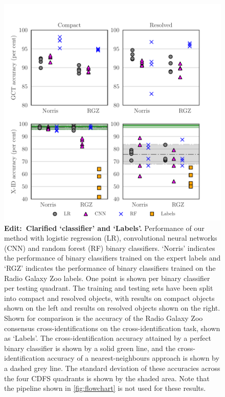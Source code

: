 \documentclass[fleqn,usenatbib,usedcolumn]{mnras}
\newcommand{\edit}[1]{{\bf Edit:~{#1}}}
\begin{document}
    \begin{figure}
    \centering
    \includegraphics[width=\columnwidth]{images/cdfs-grid-new.pdf}
    \caption{\edit{Clarified `classifier' and `Labels'.} Performance of our method with logistic regression (LR), convolutional neural networks (CNN) and random forest (RF) binary classifiers. `Norris' indicates the performance of binary classifiers trained on the expert labels and `RGZ' indicates the performance of binary classifiers trained on the Radio Galaxy Zoo labels. One point is shown per binary classifier per testing quadrant. The training and testing sets have been split into compact and resolved objects, with results on compact objects shown on the left and results on resolved objects shown on the right. Shown for comparison is the accuracy of the Radio Galaxy Zoo consensus cross-identifications on the cross-identification task, shown as `Labels'. The cross-identification accuracy attained by a perfect binary classifier is shown by a solid green line, and the cross-identification accuracy of a nearest-neighbours approach is shown by a dashed grey line. The standard deviation of these accuracies across the four CDFS quadrants is shown by the shaded area. Note that the pipeline shown in \autoref{fig:flowchart} is not used for these results. \label{fig:ba}}
    \end{figure}
\end{document}
